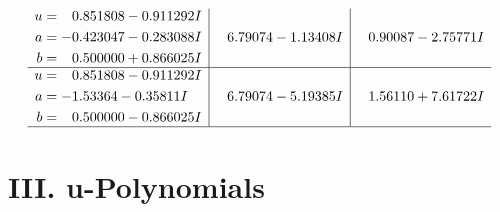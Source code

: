 \documentclass[1p]{elsarticle_modified}
\theoremstyle{definition}
\begin{document}
$$\begin{array}{c|c|c}
\begin{aligned}
u &= \phantom{-}0.851808 - 0.911292 I \\
a &= -0.423047 - 0.283088 I \\
b &= \phantom{-}0.500000 + 0.866025 I\end{aligned}
 & \phantom{-}6.79074 - 1.13408 I & \phantom{-}0.90087 - 2.75771 I \\ \hline\begin{aligned}
u &= \phantom{-}0.851808 - 0.911292 I \\
a &= -1.53364 - 0.35811 I \\
b &= \phantom{-}0.500000 - 0.866025 I\end{aligned}
 & \phantom{-}6.79074 - 5.19385 I & \phantom{-}1.56110 + 7.61722 I\\
 \hline 
 \end{array}$$\newpage
\newpage\renewcommand{\arraystretch}{1}
\centering \section*{ III. u-Polynomials}
\end{document}
